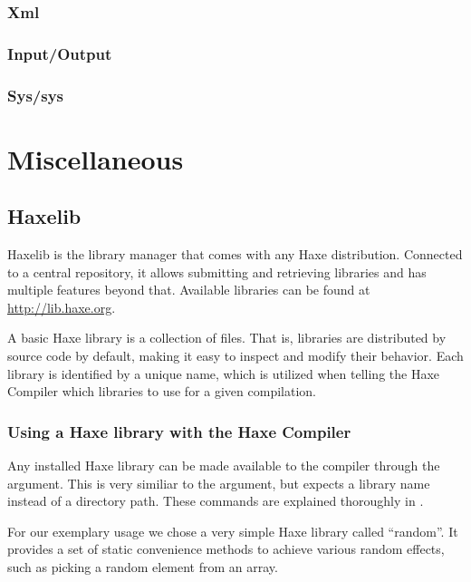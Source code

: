 \documentclass{haxe}
\begin{document}
\section{Xml}
\label{std-Xml}

\section{Input/Output}
\label{std-input-output}

\section{Sys/sys}
\label{std-sys}


\part{Miscellaneous}




\chapter{Haxelib}
\label{haxelib}

Haxelib is the library manager that comes with any Haxe distribution. Connected to a central repository, it allows submitting and retrieving libraries and has multiple features beyond that. Available libraries can be found at \url{http://lib.haxe.org}.

A basic Haxe library is a collection of  files. That is, libraries are distributed by source code by default, making it easy to inspect and modify their behavior. Each library is identified by a unique name, which is utilized when telling the Haxe Compiler which libraries to use for a given compilation.

\section{Using a Haxe library with the Haxe Compiler}
\label{haxelib-using-haxe}

Any installed Haxe library can be made available to the compiler through the  argument. This is very similiar to the  argument, but expects a library name instead of a directory path. These commands are explained thoroughly in .

For our exemplary usage we chose a very simple Haxe library called ``random''. It provides a set of static convenience methods to achieve various random effects, such as picking a random element from an array.
\end{document}
